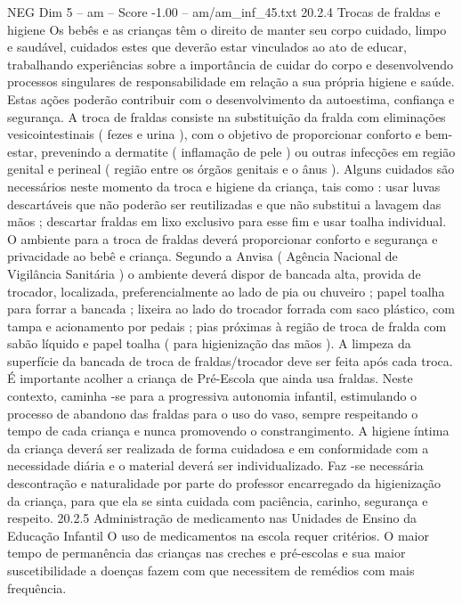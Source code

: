 \begin{textsample}{NEG Dim 5 – am – Score -1.00 – am/am\_inf\_45.txt}  \label{ex:f5_neg_223}
20.2.4 Trocas de fraldas e higiene Os bebês e as crianças têm o direito de manter seu corpo cuidado, limpo e saudável, cuidados estes que deverão estar vinculados ao ato de educar, trabalhando experiências sobre a importância de cuidar do corpo e desenvolvendo processos singulares de responsabilidade em relação a sua própria higiene e saúde.
Estas ações poderão contribuir com o desenvolvimento da autoestima, confiança e segurança.
A troca de fraldas consiste na substituição da fralda com eliminações vesicointestinais ( fezes e urina ), com o objetivo de proporcionar conforto e bem-estar, prevenindo a dermatite ( inflamação de pele ) ou outras infecções em região genital e perineal ( região entre os órgãos genitais e o ânus ).
Alguns cuidados são necessários neste momento da troca e higiene da criança, tais como : usar luvas descartáveis que não poderão ser reutilizadas e que não substitui a lavagem das mãos ; descartar fraldas em lixo exclusivo para esse fim e usar toalha individual.
O ambiente para a troca de fraldas deverá proporcionar conforto e segurança e privacidade ao bebê e criança.
Segundo a Anvisa ( Agência Nacional de Vigilância Sanitária ) o ambiente deverá dispor de bancada alta, provida de trocador, localizada, preferencialmente ao lado de pia ou chuveiro ; papel toalha para forrar a bancada ; lixeira ao lado do trocador forrada com saco plástico, com tampa e acionamento por pedais ; pias próximas à região de troca de fralda com sabão líquido e papel toalha ( para higienização das mãos ).
A limpeza da superfície da bancada de troca de fraldas/trocador deve ser feita após cada troca.
É importante acolher a criança de Pré-Escola que ainda usa fraldas.
Neste contexto, caminha -se para a progressiva autonomia infantil, estimulando o processo de abandono das fraldas para o uso do vaso, sempre respeitando o tempo de cada criança e nunca promovendo o constrangimento.
A higiene íntima da criança deverá ser realizada de forma cuidadosa e em conformidade com a necessidade diária e o material deverá ser individualizado.
Faz -se necessária descontração e naturalidade por parte do professor encarregado da higienização da criança, para que ela se sinta cuidada com paciência, carinho, segurança e respeito. 20.2.5 Administração de medicamento nas Unidades de Ensino da Educação Infantil O uso de medicamentos na escola requer critérios.
O maior tempo de permanência das crianças nas creches e pré-escolas e sua maior suscetibilidade a doenças fazem com que necessitem de remédios com mais frequência.

\end{textsample}
